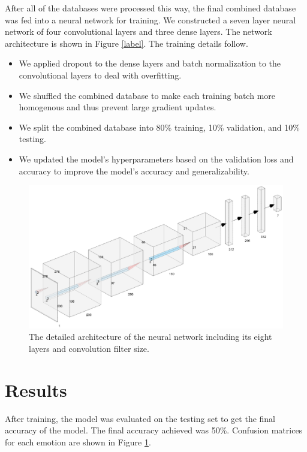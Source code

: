 \documentclass[conference]{IEEEtran}
\begin{document}
After all of the databases were processed this way, the final combined database was fed into a neural network for training. We constructed a seven layer neural network of four convolutional layers and three dense layers. The network architecture is shown in Figure \ref{label}. The training details follow.
\begin{itemize}
	\item We applied dropout to the dense layers and batch normalization to the convolutional layers to deal with overfitting.
	\item We shuffled the combined database to make each training batch more homogenous and thus prevent large gradient updates.
	\item We split the combined database into 80\% training, 10\% validation, and 10\% testing.
	\item We updated the model's hyperparameters based on the validation loss and accuracy to improve the model's accuracy and generalizability.
\end{itemize}

\begin{figure}[h!]
	\centering
	\hspace{6mm}
	\includegraphics[width=\linewidth]{neural_network_architecture.png}
	\caption{The detailed architecture of the neural network including its eight layers and convolution filter size.}
	\label{fig:high_level_dataflow_diagram}
\end{figure}

\section{Results}

After training, the model was evaluated on the testing set to get the final accuracy of the model. The final accuracy achieved was 50\%. Confusion matrices for each emotion are shown in Figure \ref{}.
\end{document}
